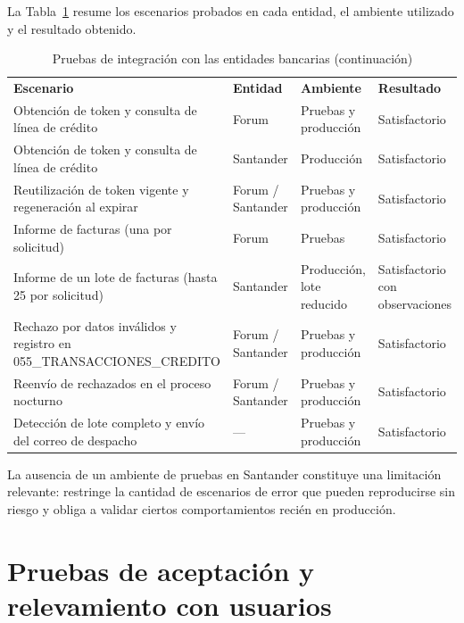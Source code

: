 La Tabla~\ref{tab:16} resume los escenarios probados en cada entidad, el ambiente utilizado y el resultado obtenido.

\begin{longtable}[]{@{}
  >{\raggedright\arraybackslash}p{}
  >{\raggedright\arraybackslash}p{}
  >{\raggedright\arraybackslash}p{}
  >{\raggedright\arraybackslash}p{}@{}}
\caption{Pruebas de integración con las entidades bancarias}\label{tab:16}\\
\toprule\noalign{}
\endfirsthead
\caption[]{Pruebas de integración con las entidades bancarias (continuación)}\\
\toprule\noalign{}
\endhead
\bottomrule\noalign{}
\endlastfoot
\textbf{Escenario} & \textbf{Entidad} & \textbf{Ambiente} & \textbf{Resultado} \\
Obtención de token y consulta de línea de crédito & Forum & Pruebas y producción & Satisfactorio \\
Obtención de token y consulta de línea de crédito & Santander & Producción & Satisfactorio \\
Reutilización de token vigente y regeneración al expirar & Forum / Santander & Pruebas y producción & Satisfactorio \\
Informe de facturas (una por solicitud) & Forum & Pruebas & Satisfactorio \\
Informe de un lote de facturas (hasta 25 por solicitud) & Santander & Producción, lote reducido & Satisfactorio con observaciones \\
Rechazo por datos inválidos y registro en 055\_TRANSACCIONES\_CREDITO & Forum / Santander & Pruebas y producción & Satisfactorio \\
Reenvío de rechazados en el proceso nocturno & Forum / Santander & Pruebas y producción & Satisfactorio \\
Detección de lote completo y envío del correo de despacho & --- & Pruebas y producción & Satisfactorio \\
\end{longtable}

La ausencia de un ambiente de pruebas en Santander constituye una limitación relevante: restringe la cantidad de escenarios de error que pueden reproducirse sin riesgo y obliga a validar ciertos comportamientos recién en producción.

\section{Pruebas de aceptación y relevamiento con usuarios}

